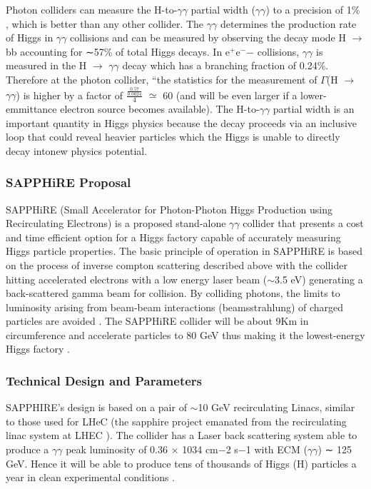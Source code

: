 Photon colliders can measure the H-to-$\gamma\gamma$ partial width ($\gamma\gamma$) to a precision of 1\% \cite{Chou:Higgs}, which is better than any other collider. The $\gamma\gamma$ determines the production rate of Higgs in $\gamma\gamma$ collisions and can be measured by observing the decay mode H $\rightarrow$ bb accounting for ∼57\% of total Higgs decays. In e$^{+}$e$^{-}$− collisions, $\gamma\gamma$ is measured in the H $\rightarrow$ $\gamma\gamma$ decay which has a branching fraction of 0.24\%. Therefore at the photon collider, ``the statistics for the measurement of $\Gamma$(H $\rightarrow$ $\gamma\gamma$) is higher by a factor of $\frac{\frac{0.57}{0.0024}}{4}$ $\simeq$ 60 (and will be even larger if a lower-emmittance electron source becomes available). \cite{Telnov:Photons} The H-to-$\gamma\gamma$ partial width is an important quantity in Higgs physics because the decay proceeds via an inclusive loop that could reveal heavier particles which the Higgs is unable to directly decay into\textemdash new physics potential.

\subsubsection{SAPPHiRE Proposal}
SAPPHiRE (Small Accelerator for Photon-Photon Higgs Production using Recirculating Electrons) is a proposed stand-alone $\gamma\gamma$ collider that presents a cost and time efficient option for a Higgs factory capable of accurately measuring Higgs particle properties. The basic principle of operation in SAPPHiRE is based on the process of inverse compton scattering described above with the collider hitting accelerated electrons with a low energy laser beam ($\sim$3.5 eV) generating a back-scattered gamma beam for collision. By colliding photons, the limits to luminosity arising from beam-beam interactions (beamsstrahlung) of charged particles are avoided \cite{Zimmermann:SAPPHiRE}. The SAPPHiRE collider will be about 9Km in circumference and accelerate particles to 80 GeV thus making it the lowest-energy Higgs factory \cite{Bogacz:SAPPHiRE}.

\subsubsection{Technical Design and Parameters}                                                                                                            SAPPHIRE's design is based on a pair of $\sim$10 GeV recirculating Linacs, similar to those used for LHeC (the sapphire project emanated from the recirculating linac system at LHEC ). The collider has a Laser back scattering system able to produce a $\gamma\gamma$ peak luminosity of 0.36 × 1034 cm−2 s−1 with ECM ($\gamma\gamma$) ∼ 125 GeV. Hence it will be able to produce tens of thousands of Higgs (H) particles a year in clean experimental conditions \cite{Bogacz:SAPPHiRE}.


